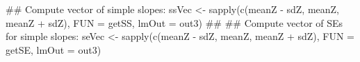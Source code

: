 \begin{Schunk}
\begin{Sinput}
 ## Compute vector of simple slopes:
 ssVec <- sapply(c(meanZ - sdZ,
                   meanZ,
                   meanZ + sdZ),
                 FUN = getSS,
                 lmOut = out3)
 ##
 ## Compute vector of SEs for simple slopes:
 seVec <- sapply(c(meanZ - sdZ,
                   meanZ,
                   meanZ + sdZ),
                 FUN = getSE,
                 lmOut = out3)
\end{Sinput}
\end{Schunk}
